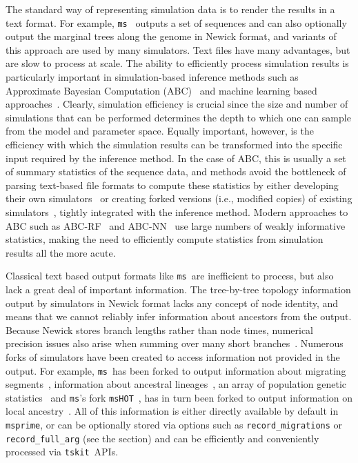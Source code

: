 \documentclass{article}
\newcommand{\msprime}[0]{\texttt{msprime}}
\newcommand{\tskit}[0]{\texttt{tskit}}
\newcommand{\ms}[0]{\texttt{ms}}
\newcommand{\msHOT}[0]{\texttt{msHOT}}
\begin{document}
The standard way of representing simulation data is
to render the results in a text format. For example,
\ms~\citep{hudson2002generating} outputs a set of sequences
and can also optionally output the marginal trees along
the genome in Newick format,
and variants of this approach are used by many simulators.
Text files have many advantages, but are slow to process
at scale.
The ability to efficiently process simulation results is
particularly important in simulation-based inference methods
such as Approximate Bayesian Computation
(ABC)~\citep{beaumont2002approximate,csillery2010approximate,wegmann2010abctoolbox}
and machine learning based
approaches~\citep{sheehan2016deep,chan2018likelihood,schrider2018supervised,
flagel2019unreasonable,sanchez2020deep}. Clearly, simulation efficiency is
crucial since the size and number of simulations that can be performed determines
the depth to which one can sample from the model and parameter space.
Equally important,
however, is the efficiency with which the simulation results can be
transformed into the specific input required by the inference method.
In the case of ABC, this is usually a set of summary statistics of the sequence
data, and methods avoid the bottleneck of parsing
text-based file formats to compute these statistics
by either developing their own
simulators~\citep[e.g.][]{cornuet2008inferring,lopes2009popabc}
or creating forked versions (i.e., modified copies) of existing
simulators~\cite[e.g.][]{thornton2006approximate,
hickerson2007msbayes,pavlidis2010msabc,huang2011mtml,quinto2018modeling},
tightly integrated with the inference method.
Modern approaches to ABC such as
ABC-RF~\citep{raynal2019abc,pudlo2016abc} and
ABC-NN~\citep{csillery2012abc,blum2010abc} use large
numbers of weakly informative statistics,
making the need to efficiently compute statistics from simulation
results all the more acute.

Classical text based output formats like \ms\ are inefficient to process,
but also lack a great deal of important information.
The tree-by-tree topology information output by simulators in Newick
format lacks any concept of node identity,
and means that we cannot reliably infer information about ancestors
from the output. Because Newick stores branch lengths rather
than node times, numerical precision issues also arise when summing
over many short branches~\citep{mcgill2013graphml}.
Numerous forks  of simulators have been created to access information not provided
in the output. For example, \ms\  has been forked to
output information about migrating segments~\citep{rosenzweig2016powerful},
information about ancestral lineages~\citep{chen2013asymptotic},
an array of population genetic statistics~\citep{ramos2007mlcoalsim}
and \ms's fork \msHOT~\citep{hellenthal2007mshot},
has in turn been forked to output information on local
ancestry~\citep{racimo2017archaic}.
All of this information
is either directly available by default in \msprime, or can be optionally
stored via options such as \texttt{record\_migrations} or
\texttt{record\_full\_arg} (see the  section) and
can be efficiently and conveniently processed via \tskit\ APIs.
\end{document}
